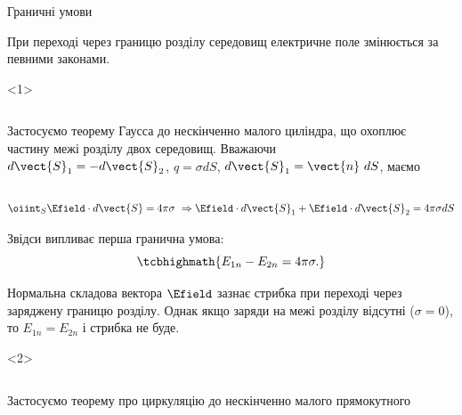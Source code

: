 \documentclass{beamer}
\begin{document}
\begin{frame}{Граничні умови}{}
	\begin{block}{}
		При переході через границю розділу середовищ електричне поле змінюється за
		певними законами.
	\end{block}
	\begin{onlyenv}
		\begin{columns}
			\begin{column}{0.6\linewidth}
				\begin{block}{}\small\justifying
					Застосуємо теорему Гаусса до нескінченно малого циліндра, що охоплює частину межі
					розділу двох
					середовищ. Вважаючи $d\vect{S}_1 = - d\vect{S}_2$, $q = \sigma dS$,
					$d\vect{S}_1 =
						\vect{n}\ dS$,
					маємо
				\end{block}
			\end{column}
			\begin{column}{0.4\linewidth}\centering
				
			\end{column}
		\end{columns}
		\begin{block}{}\small
			\begin{equation*}
				\oiint_S \Efield\cdot d\vect{S} = 4\pi\sigma\ \Rightarrow  \Efield\cdot
				d\vect{S}_1 +
				\Efield\cdot d\vect{S}_2 = 4\pi\sigma dS
			\end{equation*}
		\end{block}
		\begin{block}{}
			Звідси випливає перша гранична умова:
			\begin{equation*}
				\tcbhighmath{
					E_{1n} - E_{2n} = 4\pi\sigma.
				}
			\end{equation*}
		\end{block}
		\begin{alertblock}{}\justifying\small
			Нормальна складова вектора $\Efield$ зазнає стрибка при
			переході через заряджену границю розділу. Однак якщо заряди на межі розділу відсутні
			($\sigma =
				0$), то $E_{1n} = E_{2n}$ і стрибка не буде.
		\end{alertblock}
	\end{onlyenv}
	\begin{onlyenv}
		\begin{columns}
			\begin{column}{0.6\linewidth}
				\begin{block}{}\small\justifying
					Застосуємо теорему про циркуляцію до нескінченно малого прямокутного

\end{block}
\end{column}
\end{columns}
\end{onlyenv}
\end{frame}
\end{document}
